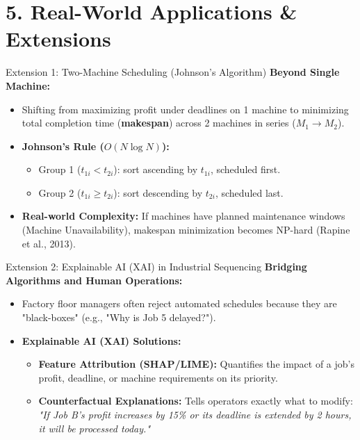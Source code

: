 \documentclass[aspectratio=169]{beamer}
\begin{document}
\section{5. Real-World Applications \& Extensions}

\begin{frame}{Extension 1: Two-Machine Scheduling (Johnson's Algorithm)}
    \textbf{Beyond Single Machine:}
    \begin{itemize}
        \item Shifting from maximizing profit under deadlines on 1 machine to minimizing total completion time (\textbf{makespan}) across 2 machines in series ($M_1 \to M_2$).
        \item \textbf{Johnson's Rule ($O(N \log N)$):}
            \begin{itemize}
                \item Group 1 ($t_{1i} < t_{2i}$): sort ascending by $t_{1i}$, scheduled first.
                \item Group 2 ($t_{1i} \ge t_{2i}$): sort descending by $t_{2i}$, scheduled last.
            \end{itemize}
        \item \textbf{Real-world Complexity:} If machines have planned maintenance windows (Machine Unavailability), makespan minimization becomes NP-hard (Rapine et al., 2013).
    \end{itemize}
\end{frame}

\begin{frame}{Extension 2: Explainable AI (XAI) in Industrial Sequencing}
    \textbf{Bridging Algorithms and Human Operations:}
    \begin{itemize}
        \item Factory floor managers often reject automated schedules because they are "black-boxes" (e.g., "Why is Job 5 delayed?").
        \item \textbf{Explainable AI (XAI) Solutions:}
            \begin{itemize}
                \item \textbf{Feature Attribution (SHAP/LIME):} Quantifies the impact of a job's profit, deadline, or machine requirements on its priority.
                \item \textbf{Counterfactual Explanations:} Tells operators exactly what to modify: \textit{"If Job B's profit increases by 15\% or its deadline is extended by 2 hours, it will be processed today."}
            \end{itemize}
    \end{itemize}
\end{frame}
\end{document}
